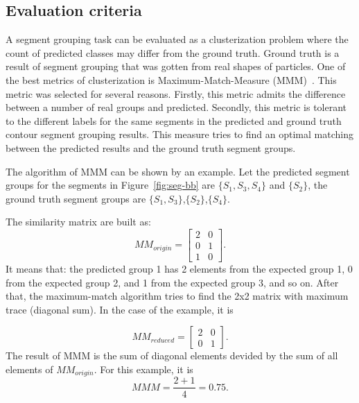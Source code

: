 \documentclass{lutmscthesis}[2010/09/22]
\begin{document}
\subsection{Evaluation criteria}
A segment grouping task can be evaluated as a clusterization problem where the count of predicted classes may differ from the ground truth. Ground truth is a result of segment grouping that was gotten from real shapes of particles. One of the best metrics of clusterization is Maximum-Match-Measure (MMM)~\cite{mm-estimate}. This metric was selected for several reasons. Firstly, this metric admits the difference between a number of real groups and predicted. Secondly, this metric is tolerant to the different labels for the same segments in the predicted and ground truth contour segment grouping results. This measure tries to find an optimal matching between the predicted results and the ground truth segment groups.

The algorithm of MMM can be shown by an example. Let the predicted segment groups for the segments in Figure~\ref{fig:seg-bb} are $\{S_1,S_3,S_4\}$ and $\{S_2\}$, the ground truth segment groups are $\{S_1,S_3\}$,$\{S_2\}$,$\{S_4\}$.

The similarity matrix are built as:
\begin{equation}
MM_{origin} = 
        \begin{bmatrix}
            2& 0 \\
            0& 1 \\
            1& 0
        \end{bmatrix}.
    \end{equation}
It means that: the predicted group 1 has 2 elements from the expected group 1, 0 from the expected group 2, and 1 from the expected group 3, and so on.
After that, the maximum-match algorithm tries to find the 2x2 matrix with maximum trace (diagonal sum). In the case of the example, it is

\begin{equation}
MM_{reduced} = 
        \begin{bmatrix}
            2& 0\\
            0& 1
        \end{bmatrix}.
    \end{equation}
The result of MMM is the sum of diagonal elements devided by the sum of all elements of $MM_{origin}$. For this example, it is 
\begin{equation}
        MMM = \frac{2+1}{4}=0.75.
\end{equation}
\end{document}
